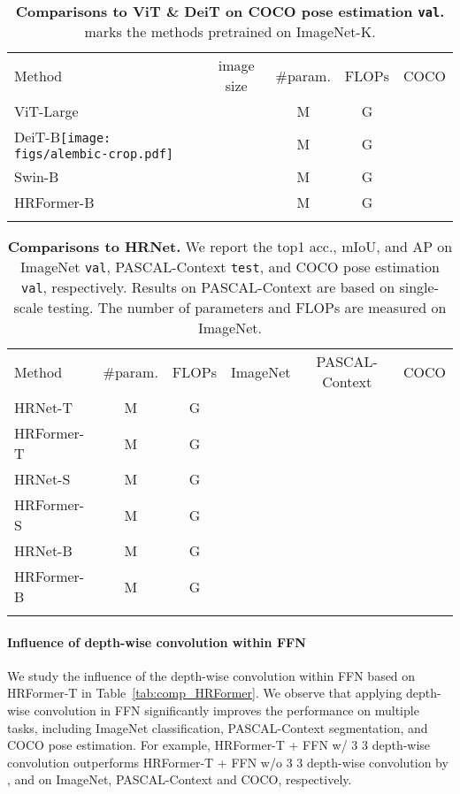\documentclass{article}
\def \deitbasedisup {DeiT-B\alambic} \def \alambic {\texttt{[image: figs/alembic-crop.pdf]}\xspace}
\begin{document}
\begin{table}[h]
  \footnotesize
  \setlength{\tabcolsep}{24 pt}
  \renewcommand{\arraystretch}{1.2}
  \centering
  \caption{\textbf{Comparisons to ViT \& DeiT on COCO pose estimation \texttt{val}.}
     marks the methods pretrained on ImageNet-K.
  }
  \label{tab:comp_vit_deit}
  {
    \begin{tabular}{l|ccc|c}
      \shline
      Method            & image size     & \#param. & FLOPs   & {COCO} \\
      \shline
      ViT-Large &  & M & G &  \\
      {\deitbasedisup}  &  & M  & G &  \\
      Swin-B    &  & M  & G &  \\
      \hline
      HRFormer-B        &  & M  & G &  \\
      \shline
    \end{tabular}
  }
\end{table}


\begin{table}[h]
  \footnotesize
  \centering
  \setlength{\tabcolsep}{15 pt}
  \renewcommand{\arraystretch}{1.3}
  \caption{\textbf{Comparisons to HRNet.}
    We report the top1 acc., mIoU, and AP on ImageNet \texttt{val}, PASCAL-Context \texttt{test}, and COCO pose estimation \texttt{val}, respectively.
    Results on PASCAL-Context are based on single-scale testing.
    The number of parameters and FLOPs are measured on ImageNet.
  }
  \label{tab:HRFormer_vs_hrnet}
  {
    \begin{tabular}{l|cc|ccc}
      \shline
      Method     & \#param. & FLOPs   & {ImageNet} & {PASCAL-Context} & {COCO} \\
      \shline
      HRNet-T    & M  & G  &      &            &  \\
      HRFormer-T & M   & G  &      &            &  \\  \hline
      HRNet-S    & M  & G  &      &            &  \\
      HRFormer-S & M  & G  &      &            &  \\ \hline
      HRNet-B    & M  & G &      &            &  \\
      HRFormer-B & M  & G &      &            &  \\
      \shline
    \end{tabular}
  }
\end{table}


\paragraph{Influence of  depth-wise convolution within FFN}
We study the influence of the  depth-wise convolution within FFN
based on HRFormer-T in Table~\ref{tab:comp_HRFormer}.
We observe that applying  depth-wise convolution in FFN significantly
improves the performance on multiple tasks, including ImageNet classification, PASCAL-Context segmentation,
and COCO pose estimation.
For example,
HRFormer-T + FFN w/ 3 3 depth-wise convolution
outperforms HRFormer-T + FFN w/o 3 3 depth-wise convolution
by ,  and 
on ImageNet, PASCAL-Context and COCO, respectively.
\end{document}
